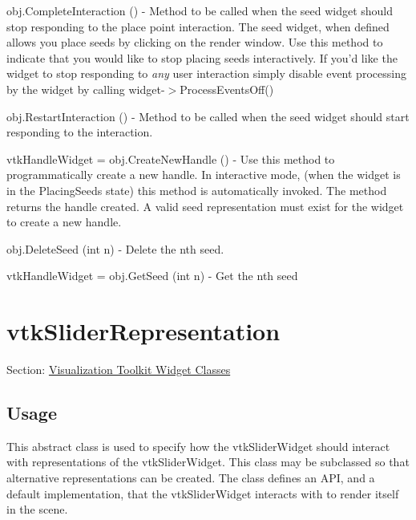 \begin{DoxyItemize}
\item {\ttfamily obj.\-Complete\-Interaction ()} -\/ Method to be called when the seed widget should stop responding to the place point interaction. The seed widget, when defined allows you place seeds by clicking on the render window. Use this method to indicate that you would like to stop placing seeds interactively. If you'd like the widget to stop responding to {\itshape any} user interaction simply disable event processing by the widget by calling widget-\/$>$Process\-Events\-Off()  
\item {\ttfamily obj.\-Restart\-Interaction ()} -\/ Method to be called when the seed widget should start responding to the interaction.  
\item {\ttfamily vtk\-Handle\-Widget = obj.\-Create\-New\-Handle ()} -\/ Use this method to programmatically create a new handle. In interactive mode, (when the widget is in the Placing\-Seeds state) this method is automatically invoked. The method returns the handle created. A valid seed representation must exist for the widget to create a new handle.  
\item {\ttfamily obj.\-Delete\-Seed (int n)} -\/ Delete the nth seed.  
\item {\ttfamily vtk\-Handle\-Widget = obj.\-Get\-Seed (int n)} -\/ Get the nth seed  
\end{DoxyItemize}\hypertarget{vtkwidgets_vtksliderrepresentation}{}\section{vtk\-Slider\-Representation}\label{vtkwidgets_vtksliderrepresentation}
Section\-: \hyperlink{sec_vtkwidgets}{Visualization Toolkit Widget Classes} \hypertarget{vtkwidgets_vtkxyplotwidget_Usage}{}\subsection{Usage}\label{vtkwidgets_vtkxyplotwidget_Usage}
This abstract class is used to specify how the vtk\-Slider\-Widget should interact with representations of the vtk\-Slider\-Widget. This class may be subclassed so that alternative representations can be created. The class defines an A\-P\-I, and a default implementation, that the vtk\-Slider\-Widget interacts with to render itself in the scene.

